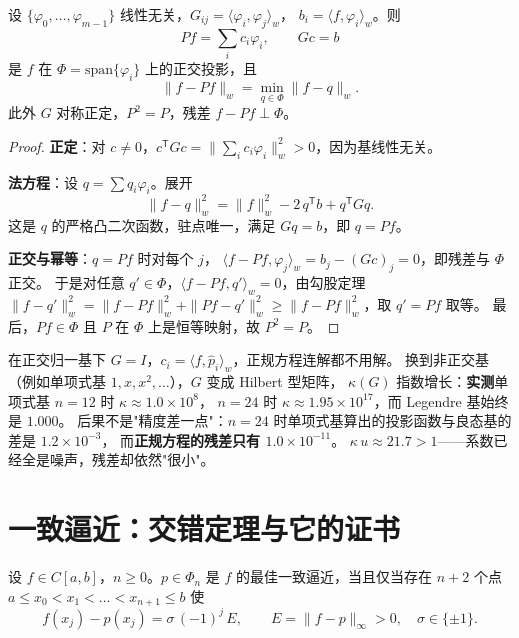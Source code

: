 \begin{theorem}[正规方程与投影]
\label{thm:projection}
设 $\{\varphi_0,\dots,\varphi_{m-1}\}$ 线性无关，$G_{ij}=\langle\varphi_i,\varphi_j\rangle_w$，
$b_i=\langle f,\varphi_i\rangle_w$。则
\[
  P f=\sum_{i} c_i\varphi_i,\qquad Gc=b
\]
是 $f$ 在 $\Phi=\mathrm{span}\{\varphi_i\}$ 上的正交投影，且
\[
  \|f-Pf\|_w=\min_{q\in\Phi}\|f-q\|_w .
\]
此外 $G$ 对称正定，$P^2=P$，残差 $f-Pf\perp\Phi$。
\end{theorem}

\begin{proof}
\textbf{正定}：对 $c\ne0$，$c^{\mathsf T}Gc=\|\sum_ic_i\varphi_i\|_w^2>0$，因为基线性无关。

\textbf{法方程}：设 $q=\sum q_i\varphi_i$。展开
\[
  \|f-q\|_w^2=\|f\|_w^2-2\,q^{\mathsf T}b+q^{\mathsf T}Gq .
\]
这是 $q$ 的严格凸二次函数，驻点唯一，满足 $Gq=b$，即 $q=Pf$。

\textbf{正交与幂等}：$q=Pf$ 时对每个 $j$，
$\langle f-Pf,\varphi_j\rangle_w=b_j-(Gc)_j=0$，即残差与 $\Phi$ 正交。
于是对任意 $q'\in\Phi$，$\langle f-Pf,q'\rangle_w=0$，由勾股定理
$\|f-q'\|_w^2=\|f-Pf\|_w^2+\|Pf-q'\|_w^2\ge\|f-Pf\|_w^2$，取 $q'=Pf$ 取等。
最后，$Pf\in\Phi$ 且 $P$ 在 $\Phi$ 上是恒等映射，故 $P^2=P$。
\end{proof}

在正交归一基下 $G=I$，$c_i=\langle f,\hat p_i\rangle_w$，正规方程连解都不用解。
换到非正交基（例如单项式基 $1,x,x^2,\dots$），$G$ 变成 Hilbert 型矩阵，
$\kappa(G)$ 指数增长：\textbf{实测}单项式基 $n=12$ 时 $\kappa\approx1.0\times10^8$，
$n=24$ 时 $\kappa\approx1.95\times10^{17}$，而 Legendre 基始终是 $1.000$。
后果不是"精度差一点"：$n=24$ 时单项式基算出的投影函数与良态基的差是 $1.2\times10^{-3}$，
而\textbf{正规方程的残差只有 $1.0\times10^{-11}$}。
$\kappa\,u\approx21.7>1$——系数已经全是噪声，残差却依然"很小"。

\section{一致逼近：交错定理与它的证书}

\begin{theorem}
\label{thm:alternation}
设 $f\in C[a,b]$，$n\ge0$。$p\in\Phi_n$ 是 $f$ 的最佳一致逼近，当且仅当存在
$n+2$ 个点 $a\le x_0<x_1<\dots<x_{n+1}\le b$ 使
\[
  f(x_j)-p(x_j)=\sigma\,(-1)^j\,E,\qquad E=\|f-p\|_\infty>0,\quad \sigma\in\{\pm1\}.
\]
\end{theorem}


